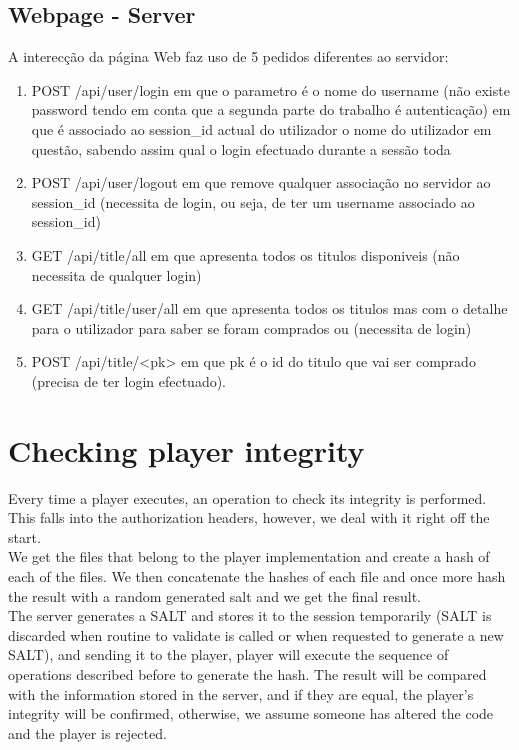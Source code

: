 \documentclass[11pt,a4paper]{report}
\begin{document}
\subsection{Webpage - Server}
A interecção da página Web faz uso de 5 pedidos diferentes ao servidor:
\begin{enumerate}
\item POST  /api/user/login em que o parametro é o nome do username (não existe password tendo em conta que a segunda parte do trabalho é autenticação) em que é associado ao session\_id actual do utilizador o nome do utilizador em questão, sabendo assim qual o login efectuado durante a sessão toda
\item POST  /api/user/logout em que remove qualquer associação no servidor ao session\_id (necessita de login, ou seja, de ter um username associado ao session\_id)
\item GET   /api/title/all em que apresenta todos os titulos disponiveis (não necessita de qualquer login)
\item GET   /api/title/user/all em que apresenta todos os titulos mas com o detalhe para o utilizador para saber se foram comprados ou (necessita de login)
\item POST  /api/title/<pk> em que pk é o id do titulo que vai ser comprado (precisa de ter login efectuado).
\end{enumerate}

\section{Checking player integrity}
\label{sec:integrity}
Every time a player executes, an operation to check its integrity is performed. This falls into the authorization headers, however, we deal with it right off the start.\\

We get the files that belong to the player implementation and create a hash of each of the files. We then concatenate the hashes of each file and once more hash the result with a random generated salt and we get the final result.\\

The server generates a SALT and stores it to the session temporarily (SALT is discarded when routine to validate is called or when requested to generate a new SALT), and sending it to the player, player will execute the sequence of operations described before to generate the hash. The result will be compared with the information stored in the server, and if they are equal, the player's integrity will be confirmed, otherwise, we assume someone has altered the code and the player is rejected.
\end{document}
